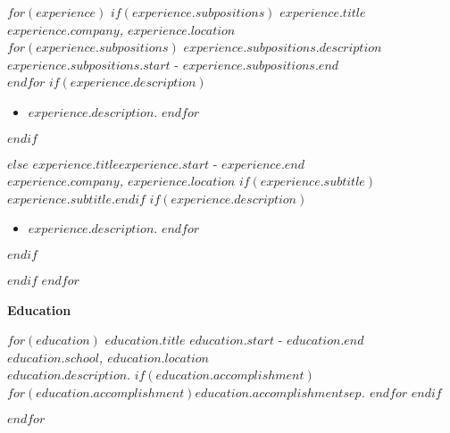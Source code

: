 \documentclass[]{$documentclass$}
\newcommand\mytitle[1]{\vspace{5mm}\textbf{\Large #1}\par\vspace{5pt}}
\def\titleeducation{Utdanning}
\def\titleeducation{Education}
\begin{document}
{    $for(experience)$
        $if(experience.subpositions)$
            \textbf{$experience.title$}\\
            \textit{$experience.company$, $experience.location$}\\
            $for(experience.subpositions)$
                $experience.subpositions.description$ \hfill $experience.subpositions.start$ - $experience.subpositions.end$\\
            $endfor$
            $if(experience.description)$
            \par\vspace{-\itemspacing}
            \begin{itemize}
            $for(experience.description)$
                \item $experience.description$.
            $endfor$
            \end{itemize}
            $endif$
            \par\vspace{\itemspacing}
        $else$
            \textbf{$experience.title$}\hfill $experience.start$ - $experience.end$\\
            \textit{$experience.company$, $experience.location$}
            $if(experience.subtitle)$\\$experience.subtitle$.$endif$
            $if(experience.description)$
            \begin{itemize}
            $for(experience.description)$
                \item $experience.description$.
            $endfor$
            \end{itemize}
            $endif$
            \par\vspace{\itemspacing}
        $endif$
    $endfor$
    \par\vspace{-\itemspacing}

    \mytitle{\titleeducation}
    $for(education)$
        \textbf{$education.title$} \hfill $education.start$ - $education.end$\\
        \textit{$education.school$, $education.location$}\\
        $education.description$.
        $if(education.accomplishment)$
        \textit{$for(education.accomplishment)$$education.accomplishment$$sep$. $endfor$}
        $endif$
        \par\vspace{\itemspacing}
    $endfor$
    \par\vspace{-\itemspacing}

}
\end{document}
